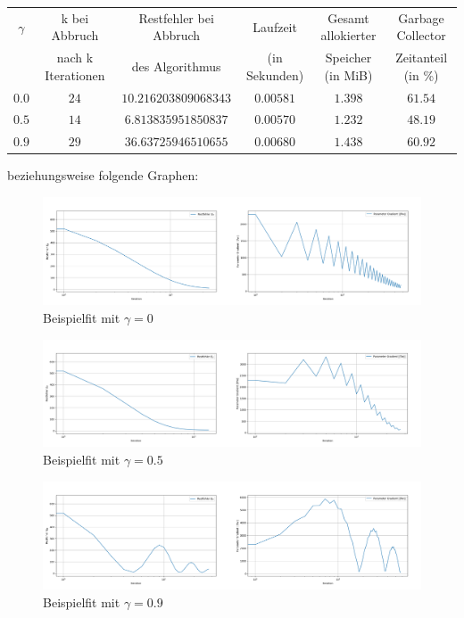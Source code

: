\documentclass{article}
\theoremstyle{plain} %
\theoremstyle{definition} %
\begin{document}
\begin{center}
  \begin{tabular}{cccccc}
    \toprule
    $\gamma$ & k bei Abbruch & Restfehler bei Abbruch  & Laufzeit & Gesamt allokierter & Garbage Collector\\
    &  nach k Iterationen & des Algorithmus & (in Sekunden) & Speicher (in MiB) & Zeitanteil (in \%) \\
    \midrule
        $0.0$ & $24$ & $10.216203809068343$ & $0.00581$ & $1.398$ & \sout{$61.54$} \\
        $0.5$ & $14$ & $6.813835951850837$  & $0.00570$ & $1.232$ & \sout{$48.19$} \\
        $0.9$ & $29$ & $36.63725946510655$  & $0.00680$ & $1.438$ & \sout{$60.92$} \\
  \end{tabular}
\end{center}

beziehungsweise folgende Graphen:

\begin{figure}[H]
  \centering
  \includegraphics[width=\textwidth]{Momentum_0_0_Error_10e-3}
  \caption{Beispielfit mit $\gamma=0$}
\end{figure}
\begin{figure}[H]
  \centering
  \includegraphics[width=\textwidth]{Momentum_0_5_Error_10e-3}
  \caption{Beispielfit mit $\gamma=0.5$}
\end{figure}
\begin{figure}[H]
  \centering
  \includegraphics[width=\textwidth]{Momentum_0_9_Error_10e-3}
  \caption{Beispielfit mit $\gamma=0.9$}
\end{figure}
\end{document}

